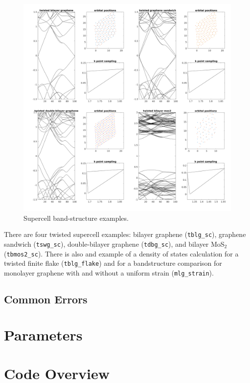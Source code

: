 \documentclass[10pt,a4paper]{article}
\begin{document}
\begin{figure}
  \includegraphics[width=\textwidth]{supercell_examples.png}
  \caption{
  Supercell band-structure examples.
  }
  \label{fig:tblg_sc}
\end{figure}

There are four twisted supercell examples: bilayer graphene (\texttt{tblg\_sc}), graphene sandwich (\texttt{tswg\_sc}), double-bilayer graphene (\texttt{tdbg\_sc}), and bilayer MoS$_2$ (\texttt{tbmos2\_sc}).
There is also and example of a density of states calculation for a twisted finite flake (\texttt{tblg\_flake}) and for a bandstructure comparison for monolayer graphene with and without a uniform strain (\texttt{mlg\_strain}).



\subsection{Common Errors}

\section{Parameters}

\section{Code Overview}
\end{document}
